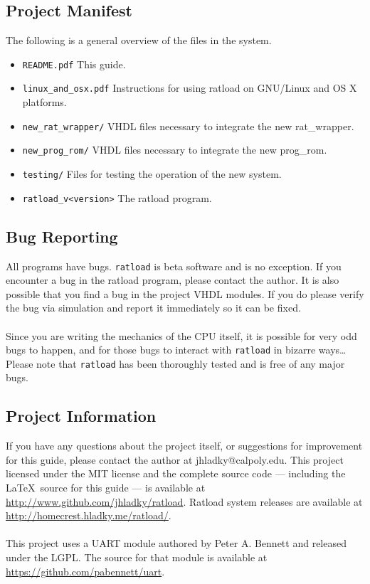 \documentclass[notitlepage]{article}
\begin{document}
\subsection{Project Manifest}
The following is a general overview of the files in the system.
\begin{itemize}
\item \texttt{README.pdf} This guide.
\item \texttt{linux\_and\_osx.pdf} Instructions for using ratload on GNU/Linux and OS X platforms.
\item \texttt{new\_rat\_wrapper/} VHDL files necessary to integrate the new rat\_wrapper.
\item \texttt{new\_prog\_rom/} VHDL files necessary to integrate the new prog\_rom.
\item \texttt{testing/} Files for testing the operation of the new system.
\item \texttt{ratload\_v{\textless}version\textgreater} The ratload program.
\end{itemize}

\subsection{Bug Reporting}
All programs have bugs. \texttt{ratload} is beta software and is no exception. If you encounter a bug in the ratload program, please contact the author. It is also possible that you find a bug in the project VHDL modules. If you do please verify the bug via simulation and report it immediately so it can be fixed.\\\\
Since you are writing the mechanics of the CPU itself, it is possible for very odd bugs to happen, and for those bugs to interact with \texttt{ratload} in bizarre ways\ldots Please note that \texttt{ratload} has been thoroughly tested and is free of any major bugs.

\subsection{Project Information}
If you have any questions about the project itself, or suggestions for improvement for this guide, please contact the author at jhladky@calpoly.edu. This project licensed under the MIT license and the complete source code --- including the \LaTeX ~source for this guide --- is available at \url{http://www.github.com/jhladky/ratload}. Ratload system releases are available at \url{http://homecrest.hladky.me/ratload/}.\\\\
This project uses a UART module authored by Peter A. Bennett and released under the LGPL. The source for that module is available at \url{https://github.com/pabennett/uart}.
\end{document}
